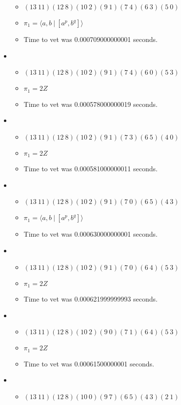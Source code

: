 \documentclass{article}
\begin{document}
\begin{itemize}
\begin{itemize}
      \item $(13\ 11)(12\ 8)(10\ 2)(9\ 1)(7\ 4)(6\ 3)(5\ 0)$
      \item $\pi_1 = \langle a,b\ |\ [a^p,b^q]\rangle$
      \item Time to vet was 0.000709000000001 seconds.
\end{itemize}
\item \begin{itemize}
      \item $(13\ 11)(12\ 8)(10\ 2)(9\ 1)(7\ 4)(6\ 0)(5\ 3)$
      \item $\pi_1 =2 Z$
      \item Time to vet was 0.000578000000019 seconds.
\end{itemize}
\item \begin{itemize}
      \item $(13\ 11)(12\ 8)(10\ 2)(9\ 1)(7\ 3)(6\ 5)(4\ 0)$
      \item $\pi_1 =2 Z$
      \item Time to vet was 0.000581000000011 seconds.
\end{itemize}
\item \begin{itemize}
      \item $(13\ 11)(12\ 8)(10\ 2)(9\ 1)(7\ 0)(6\ 5)(4\ 3)$
      \item $\pi_1 = \langle a,b\ |\ [a^p,b^q]\rangle$
      \item Time to vet was 0.000630000000001 seconds.
\end{itemize}
\item \begin{itemize}
      \item $(13\ 11)(12\ 8)(10\ 2)(9\ 1)(7\ 0)(6\ 4)(5\ 3)$
      \item $\pi_1 =2 Z$
      \item Time to vet was 0.000621999999993 seconds.
\end{itemize}
\item \begin{itemize}
      \item $(13\ 11)(12\ 8)(10\ 2)(9\ 0)(7\ 1)(6\ 4)(5\ 3)$
      \item $\pi_1 =2 Z$
      \item Time to vet was 0.00061500000001 seconds.
\end{itemize}
\item \begin{itemize}
      \item $(13\ 11)(12\ 8)(10\ 0)(9\ 7)(6\ 5)(4\ 3)(2\ 1)$

\end{itemize}
\end{itemize}
\end{document}
